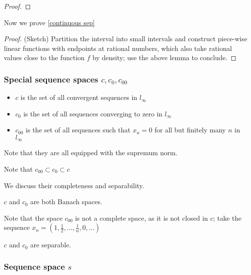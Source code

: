 \documentclass{article}
\begin{document}
\begin{proof}

\end{proof}

Now we prove \autoref{continuous sep}  
\begin{proof}
(Sketch)  
Partition the interval into small intervals and construct piece-wise linear functions with endpoints at rational numbers, which also take rational values close to the function $f$ by density; use the above lemma to conclude.
\end{proof}

\subsubsection*{Special sequence spaces $c, c_0, c_{00}$}  
\begin{itemize}
    \item $c$ is the set of all convergent sequences in $l_{\infty}$
    \item $c_0$ is the set of all sequences converging to zero in $l_{\infty}$
    \item $c_{00}$ is the set of all sequences such that $x_n=0$ for all
          but finitely many $n$ in $l_{\infty}$
\end{itemize}  

Note that they are all equipped with the supremum norm.  

\begin{remark}
    Note that $c_{00} \subset c_{0} \subset c$
\end{remark}  

We discuss their completeness and separability.  

\begin{prop}
    $c$ and $c_0$ are both Banach spaces.
\end{prop}  

\begin{eg}
    Note that the space $c_{00}$ is not a complete space, as it is not
    closed in $c$; take the sequence $x_n = (1, \frac{1}{2}, \ldots, \frac{1}{n}, 0, \ldots)$
\end{eg}

\begin{prop}
    $c$ and $c_0$ are separable.
\end{prop}  


\subsubsection*{Sequence space $s$}  
\end{document}
